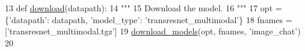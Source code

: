 \begin{DoxyCode}
13 \textcolor{keyword}{def }\hyperlink{namespaceparlai_1_1zoo_1_1image__chat_1_1transresnet__multimodal_a07b4f0a9e7658b5b5599d6d71bc08f2a}{download}(datapath):
14     \textcolor{stringliteral}{"""}
15 \textcolor{stringliteral}{    Download the model.}
16 \textcolor{stringliteral}{    """}
17     opt = \{\textcolor{stringliteral}{'datapath'}: datapath, \textcolor{stringliteral}{'model\_type'}: \textcolor{stringliteral}{'transresnet\_multimodal'}\}
18     fnames = [\textcolor{stringliteral}{'transresnet\_multimodal.tgz'}]
19     \hyperlink{namespaceparlai_1_1core_1_1build__data_ab697f23f05d3e36d7979fe5e0ed7911e}{download\_models}(opt, fnames, \textcolor{stringliteral}{'image\_chat'})
20 \end{DoxyCode}
